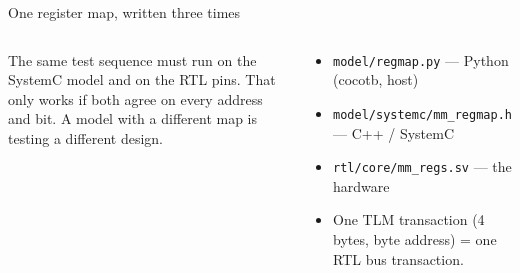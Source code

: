 \documentclass[aspectratio=169,11pt]{beamer}
\newcommand{\file}[1]{\texttt{\textcolor{copper}{#1}}}
\begin{document}
\begin{frame}{One register map, written three times}
  \begin{columns}[T]
    \begin{why}
      The same test sequence must run on the SystemC model and on the RTL pins. That only works
      if both agree on every address and bit. A model with a different map is testing a different
      design.
    \end{why}
    \begin{how}
      \begin{itemize}
        \item \file{model/regmap.py} --- Python (cocotb, host)
        \item \file{model/systemc/mm\_regmap.h} --- C++ / SystemC
        \item \file{rtl/core/mm\_regs.sv} --- the hardware
        \item One TLM transaction (4 bytes, byte address) = one RTL bus transaction.
      \end{itemize}
    \end{how}
    \scriptsize
  \end{columns}
\end{frame}
\end{document}
